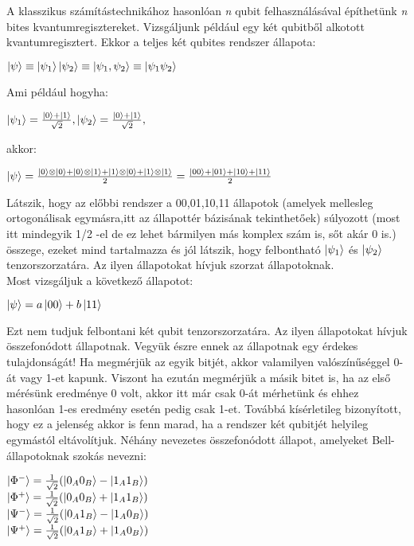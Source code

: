 A klasszikus számítástechnikához hasonlóan \textit{n} qubit felhasználásával építhetünk \textit{n} bites kvantumregisztereket. Vizsgáljunk például egy két qubitből alkotott kvantumregisztert. Ekkor a teljes két qubites rendszer állapota:
\begin{center}
$ \ket{\psi} \equiv \ket{\psi_1}\ket{\psi_2} \equiv \ket{\psi_1,\psi_2} \equiv \ket{\psi_1\psi_2} $
\end{center}
Ami például hogyha:
\begin{center}
$ \ket{\psi_1} = \frac{\ket{0}+\ket{1}}{\sqrt{2}}, \ket{\psi_2}=\frac{\ket{0}+\ket{1}}{\sqrt{2}}, $
\end{center}
akkor:
\begin{center}
$ \ket{\psi}= \frac{\ket{0} \otimes \ket{0} +\ket{0}\otimes\ket{1}+\ket{1}\otimes\ket{0}+\ket{1}\otimes\ket{1}  }{2} = \frac{\ket{00}+\ket{01}+\ket{10}+\ket{11}}{2} $
\end{center}
Látszik, hogy az előbbi rendszer a 00,01,10,11 állapotok (amelyek mellesleg ortogonálisak egymásra,itt az állapottér bázisának tekinthetőek) súlyozott (most itt mindegyik 1/2 -el de ez lehet bármilyen más komplex szám is, sőt akár 0 is.) összege, ezeket mind tartalmazza és jól látszik, hogy felbontható $\ket{\psi_1}$  és  $\ket{\psi_2}$  tenzorszorzatára. Az ilyen állapotokat hívjuk szorzat állapotoknak.\\
Most vizsgáljuk a következő állapotot:
\begin{center}
$ \ket{\psi} = a\ket{00}+b\ket{11} $
\end{center}
Ezt nem tudjuk felbontani két qubit tenzorszorzatára. Az ilyen állapotokat hívjuk összefonódott állapotnak. Vegyük észre ennek az állapotnak egy érdekes tulajdonságát! Ha megmérjük az egyik bitjét, akkor valamilyen valószínűséggel 0-át vagy 1-et kapunk. Viszont ha ezután megmérjük a másik bitet is, ha az első mérésünk eredménye 0 volt, akkor itt már csak 0-át mérhetünk és ehhez hasonlóan 1-es eredmény esetén pedig csak 1-et. Továbbá kísérletileg bizonyított, hogy ez a jelenség akkor is fenn marad, ha a rendszer két qubitjét helyileg egymástól eltávolítjuk.
Néhány nevezetes összefonódott állapot, amelyeket Bell-állapotoknak szokás nevezni:
\begin{center}
$ \ket{\Phi^-}= \frac{1}{\sqrt{2}}(\ket{0_A0_B}-\ket{1_A1_B}) $ \\
$ \ket{\Phi^+}= \frac{1}{\sqrt{2}}(\ket{0_A0_B}+\ket{1_A1_B}) $ \\
$ \ket{\Psi^-}= \frac{1}{\sqrt{2}}(\ket{0_A1_B}-\ket{1_A0_B}) $ \\
$ \ket{\Psi^+}= \frac{1}{\sqrt{2}}(\ket{0_A1_B}+\ket{1_A0_B}) $ \\

\end{center}

